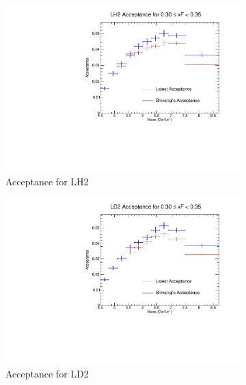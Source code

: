 \documentclass[11pt]{article}
\begin{document}
\begin{figure}[p]
    \centering
    \begin{subfigure}[b]{0.48\textwidth}
       \includegraphics[width=\linewidth]{./acceptancePlots/LH2_acceptance_xF_bin_6.pdf}
       \caption{Acceptance for LH2}
    \end{subfigure}\hfill
    \begin{subfigure}[b]{0.48\textwidth}
       \includegraphics[width=\linewidth]{./acceptancePlots/LD2_acceptance_xF_bin_6.pdf}
       \caption{Acceptance for LD2}
    \end{subfigure}
    \begin{subfigure}[b]{0.48\textwidth}

\end{subfigure}
\end{figure}
\end{document}
